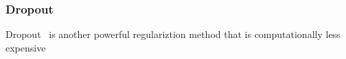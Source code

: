 \subsubsection{Dropout}

Dropout~\cite{JMLR:v15:srivastava14a} is another powerful regulariztion method that is computationally less expensive